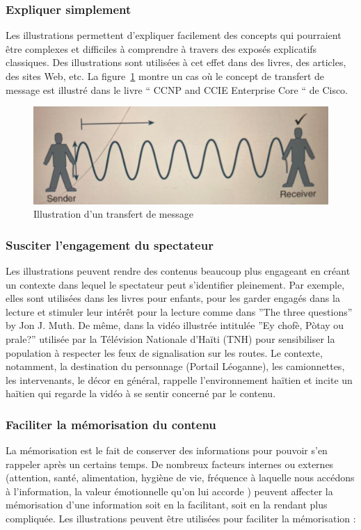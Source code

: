\subsubsection{Expliquer simplement}
Les illustrations permettent d'expliquer facilement des concepts qui pourraient \^etre complexes et difficiles \`a comprendre \`a travers des expos\'es explicatifs classiques. Des illustrations sont utilis\'ees \`a cet effet dans des  livres, des articles, des sites Web, etc. La figure~\ref{CiscoReseau} montre un cas o\`u le concept de transfert de message est illustr\'e dans le livre `` CCNP and CCIE Enterprise Core `` de Cisco.


\begin{figure}[ht]
	\centering
	\includegraphics[width=0.75\linewidth]{Pictures/Sending Message.jpg}
	\caption{Illustration d'un transfert de message\cite{CiscoMessage}}
	\label{CiscoReseau}
\end{figure}


\subsubsection{Susciter l'engagement du spectateur}
Les illustrations peuvent rendre des contenus beaucoup plus engageant en cr\'eant un contexte dans lequel le spectateur peut s'identifier pleinement. Par exemple, elles sont utilis\'ees dans les livres pour enfants, pour les garder engag\'es dans la lecture et stimuler leur int\'er\^et pour la lecture comme dans ''The three questions'' by Jon J. Muth. De m\^eme, dans la vid\'eo illustr\'ee intitul\'ee ''Ey chof\`e, P\`otay ou prale?'' utilis\'ee par la T\'el\'evision Nationale d'Ha\"iti (TNH) pour sensibiliser la population \`a respecter les feux de signalisation sur les routes. Le contexte, notamment, la destination du personnage (Portail L\'eoganne), les camionnettes, les intervenants, le d\'ecor en g\'en\'eral, rappelle l'environnement ha\"itien et incite un ha\"itien qui regarde la vid\'eo \`a se sentir concern\'e par le contenu.\\


\subsubsection{Faciliter la m\'emorisation du contenu}
La m\'emorisation est le fait de conserver des informations pour pouvoir s'en rappeler apr\`es un certains temps. De nombreux facteurs  internes ou externes (attention, sant\'e, alimentation, hygi\`ene de vie, fr\'equence \`a laquelle nous acc\'edons \`a l'information, la valeur \'emotionnelle qu'on lui accorde ) peuvent affecter la m\'emorisation d'une information soit en la facilitant, soit en la rendant plus compliqu\'ee.  Les illustrations peuvent \^etre utilis\'ees pour faciliter la m\'emorisation :\\

